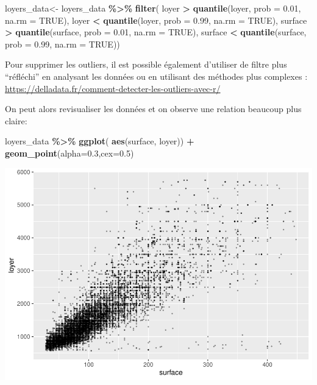\documentclass[
]{book}
\newenvironment{Shaded}{\begin{snugshade}}{\end{snugshade}}
\newcommand{\AttributeTok}[1]{\textcolor[rgb]{0.13,0.29,0.53}{#1}}
\newcommand{\ConstantTok}[1]{\textcolor[rgb]{0.56,0.35,0.01}{#1}}
\newcommand{\FloatTok}[1]{\textcolor[rgb]{0.00,0.00,0.81}{#1}}
\newcommand{\FunctionTok}[1]{\textcolor[rgb]{0.13,0.29,0.53}{\textbf{#1}}}
\newcommand{\NormalTok}[1]{#1}
\newcommand{\OtherTok}[1]{\textcolor[rgb]{0.56,0.35,0.01}{#1}}
\newcommand{\SpecialCharTok}[1]{\textcolor[rgb]{0.81,0.36,0.00}{\textbf{#1}}}
\begin{document}
\begin{Shaded}
\begin{Highlighting}[]
\NormalTok{loyers\_data}\OtherTok{\textless{}{-}}\NormalTok{ loyers\_data }\SpecialCharTok{\%\textgreater{}\%}
  \FunctionTok{filter}\NormalTok{(}
\NormalTok{    loyer }\SpecialCharTok{\textgreater{}} \FunctionTok{quantile}\NormalTok{(loyer, }\AttributeTok{prob =} \FloatTok{0.01}\NormalTok{, }\AttributeTok{na.rm =} \ConstantTok{TRUE}\NormalTok{),}
\NormalTok{    loyer }\SpecialCharTok{\textless{}} \FunctionTok{quantile}\NormalTok{(loyer, }\AttributeTok{prob =} \FloatTok{0.99}\NormalTok{, }\AttributeTok{na.rm =} \ConstantTok{TRUE}\NormalTok{),}
\NormalTok{    surface }\SpecialCharTok{\textgreater{}} \FunctionTok{quantile}\NormalTok{(surface, }\AttributeTok{prob =} \FloatTok{0.01}\NormalTok{, }\AttributeTok{na.rm =} \ConstantTok{TRUE}\NormalTok{),}
\NormalTok{    surface }\SpecialCharTok{\textless{}} \FunctionTok{quantile}\NormalTok{(surface, }\AttributeTok{prob =} \FloatTok{0.99}\NormalTok{, }\AttributeTok{na.rm =} \ConstantTok{TRUE}\NormalTok{))}
\end{Highlighting}
\end{Shaded}

Pour supprimer les outliers, il est possible également d'utiliser de
filtre plus ``réfléchi'' en analysant les données ou en utilisant des
méthodes plus complexes :
\url{https://delladata.fr/comment-detecter-les-outliers-avec-r/}

On peut alors revisualiser les données et on observe une relation
beaucoup plus claire:

\begin{Shaded}
\begin{Highlighting}[]
\NormalTok{loyers\_data }\SpecialCharTok{\%\textgreater{}\%}
    \FunctionTok{ggplot}\NormalTok{( }\FunctionTok{aes}\NormalTok{(surface, loyer)) }\SpecialCharTok{+}
    \FunctionTok{geom\_point}\NormalTok{(}\AttributeTok{alpha=}\FloatTok{0.3}\NormalTok{,}\AttributeTok{cex=}\FloatTok{0.5}\NormalTok{)}
\end{Highlighting}
\end{Shaded}

\includegraphics{bookdown-demo_files/figure-latex/unnamed-chunk-6-1.pdf}
\end{document}
